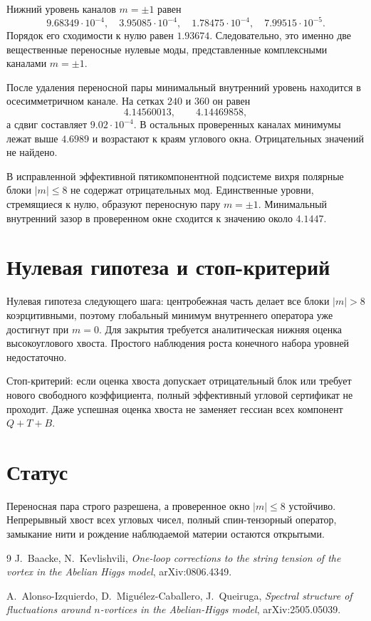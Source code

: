 Нижний уровень каналов $m=\pm1$ равен
\[
 9.68349\cdot10^{-4},\quad
 3.95085\cdot10^{-4},\quad
 1.78475\cdot10^{-4},\quad
 7.99515\cdot10^{-5}.
\]
Порядок его сходимости к нулю равен $1.93674$. Следовательно, это именно две
вещественные переносные нулевые моды, представленные комплексными каналами
$m=\pm1$.

После удаления переносной пары минимальный внутренний уровень находится в
осесимметричном канале. На сетках $240$ и $360$ он равен
\[
 4.14560013,\qquad 4.14469858,
\]
а сдвиг составляет $9.02\cdot10^{-4}$. В остальных проверенных каналах
минимумы лежат выше $4.6989$ и возрастают к краям углового окна. Отрицательных
значений не найдено.

\begin{theorem}
В исправленной эффективной пятикомпонентной подсистеме вихря полярные блоки
$|m|\le8$ не содержат отрицательных мод. Единственные уровни, стремящиеся к
нулю, образуют переносную пару $m=\pm1$. Минимальный внутренний зазор в
проверенном окне сходится к значению около $4.1447$.
\end{theorem}

\section{Нулевая гипотеза и стоп-критерий}

Нулевая гипотеза следующего шага: центробежная часть делает все блоки
$|m|>8$ коэрцитивными, поэтому глобальный минимум внутреннего оператора уже
достигнут при $m=0$. Для закрытия требуется аналитическая нижняя оценка
высокоуглового хвоста. Простого наблюдения роста конечного набора уровней
недостаточно.

Стоп-критерий: если оценка хвоста допускает отрицательный блок или требует
нового свободного коэффициента, полный эффективный угловой сертификат не
проходит. Даже успешная оценка хвоста не заменяет гессиан всех компонент
$Q+T+B$.

\section{Статус}

Переносная пара строго разрешена, а проверенное окно $|m|\le8$ устойчиво.
Непрерывный хвост всех угловых чисел, полный спин-тензорный оператор,
замыкание нити и рождение наблюдаемой материи остаются открытыми.

\begin{thebibliography}{9}
J.~Baacke, N.~Kevlishvili,
\emph{One-loop corrections to the string tension of the vortex in the
Abelian Higgs model}, arXiv:0806.4349.

A.~Alonso-Izquierdo, D.~Migu\'elez-Caballero, J.~Queiruga,
\emph{Spectral structure of fluctuations around $n$-vortices in the
Abelian-Higgs model}, arXiv:2505.05039.
\end{thebibliography}